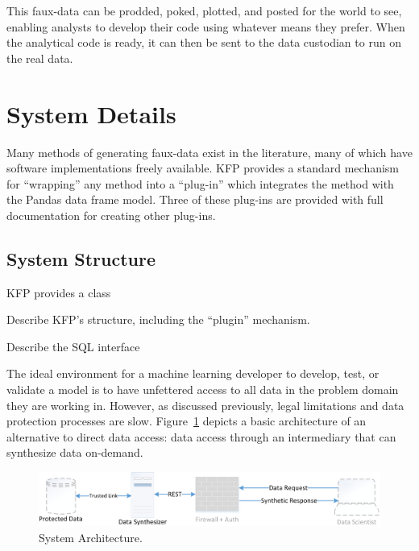\documentclass{article}
\begin{document}
This faux-data can be prodded, poked, plotted, and posted for the world to see, enabling analysts to develop their code using whatever means they prefer.   When the analytical code is ready, it can then be sent to the data custodian to run on the real data.


\section{System Details}


Many methods of generating faux-data exist in the literature, many of which have software implementations freely available.   KFP provides a standard mechanism for ``wrapping'' any method into a ``plug-in'' which integrates the method with the Pandas data frame model.  Three of these plug-ins are provided with full documentation for creating other plug-ins.

\subsection{System Structure}
KFP provides a class

Describe KFP's structure, including the ``plugin'' mechanism.

Describe the SQL interface

The ideal environment for a machine learning developer to develop, test, or validate a model is to have unfettered access to all data in the problem domain they are working in. However, as discussed previously, legal limitations and data protection processes are slow. Figure~\ref{fig:architecture} depicts a basic architecture of an alternative to direct data access: data access through an intermediary that can synthesize data on-demand.

\begin{figure}[ht]
  \centering
  \includegraphics[width=\textwidth]{prototype_architecture}
  \caption{System Architecture.}
  \label{fig:architecture}
\end{figure}
\end{document}
